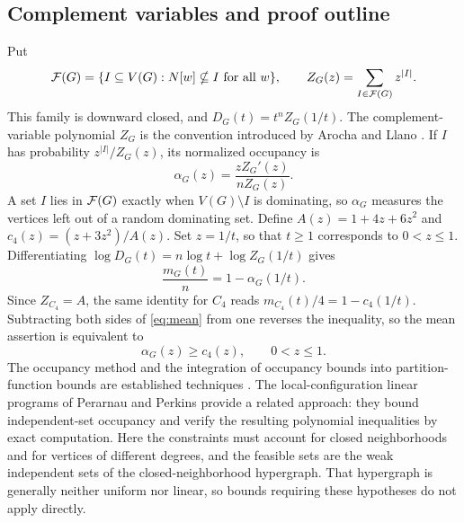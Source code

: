 \documentclass[11pt]{article}
\begin{document}
\subsection{Complement variables and proof outline}
Put
\[
 \mathcal F(G)=\{I\subseteq V(G):N[w]\nsubseteq I\text{ for all }w\},\qquad
 Z_G(z)=\sum_{I\in\mathcal F(G)}z^{|I|}.
\]
This family is downward closed, and $D_G(t)=t^nZ_G(1/t)$. The complement-variable polynomial $Z_G$ is the convention introduced by Arocha and Llano \cite[Section 3]{AL2000}. If $I$ has probability $z^{|I|}/Z_G(z)$, its normalized occupancy is
\[
 \alpha_G(z)=\frac{zZ_G'(z)}{nZ_G(z)}.
\]
A set $I$ lies in $\mathcal F(G)$ exactly when $V(G)\setminus I$ is dominating, so $\alpha_G$ measures the vertices left out of a random dominating set. Define $A(z)=1+4z+6z^2$ and $c_4(z)=(z+3z^2)/A(z)$. Set $z=1/t$, so that $t\ge1$ corresponds to $0<z\le1$. Differentiating $\log D_G(t)=n\log t+\log Z_G(1/t)$ gives
\[
 \frac{m_G(t)}n=1-\alpha_G(1/t).
\]
Since $Z_{C_4}=A$, the same identity for $C_4$ reads $m_{C_4}(t)/4=1-c_4(1/t)$. Subtracting both sides of \eqref{eq:mean} from one reverses the inequality, so the mean assertion is equivalent to
\begin{equation}\label{eq:occupancy}
 \alpha_G(z)\ge c_4(z),\qquad 0<z\le1.
\end{equation}
The occupancy method and the integration of occupancy bounds into partition-function bounds are established techniques \cite{DJPR2017,CPST2021}. The local-configuration linear programs of Perarnau and Perkins \cite{PP2018} provide a related approach: they bound independent-set occupancy and verify the resulting polynomial inequalities by exact computation. Here the constraints must account for closed neighborhoods and for vertices of different degrees, and the feasible sets are the weak independent sets of the closed-neighborhood hypergraph. That hypergraph is generally neither uniform nor linear, so bounds requiring these hypotheses do not apply directly.
\end{document}
